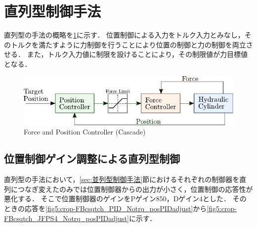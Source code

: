 \newpage
\section{直列型制御手法}
直列型の手法の概略を\figname\ref{fig5:casquade_torqueandposition}に示す．
位置制御による入力をトルク入力とみなし，そのトルクを満たすように力制御を行うことにより位置の制御と力の制御を両立させる．
また，トルク入力値に制限を設けることにより，その制限値が力目標値となる．

\begin{figure}[t]
    \centering
        \includegraphics[keepaspectratio, scale = 1.0]{contents/IntegrationControl/figure/casquade_torqueandposition.pdf}
        \caption{Force and Position Controller (Cascade)}
        \label{fig5:casquade_torqueandposition}
\end{figure}

\subsection{位置制御ゲイン調整による直列型制御}
直列型の手法において，\ref{sec:並列型制御手法}節におけるそれぞれの制御器を直列につなぎ変えたのみでは位置制御器からの出力が小さく，位置制御の応答性が悪化する．
そこで位置制御器のゲインをPゲイン850，Dゲイン4とした．
そのときの応答を\figname\ref{fig5:crop-FBcsqtch_PID_Notrq_posPIDadjust}から\figname\ref{fig5:crop-FBcsqtch_JFPS4_Notrq_posPIDadjust}に示す．


